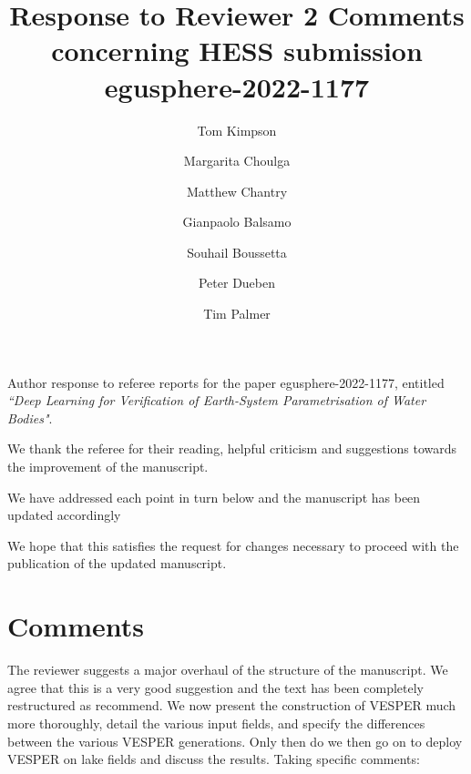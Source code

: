 \documentclass[10pt]{article}
\author{Tom Kimpson \\ 
	\and Margarita Choulga\\ 
 \and Matthew Chantry\\
\and Gianpaolo Balsamo\\  
 \and Souhail Boussetta\\
  \and Peter Dueben\\
   \and Tim Palmer\\
}
\title{\normalsize Response to Reviewer 2 Comments
  concerning HESS submission egusphere-2022-1177}
\begin{document}
	\maketitle
\noindent Author response to referee reports for the paper egusphere-2022-1177,
entitled \textit{``Deep Learning for Verification of Earth-System Parametrisation of Water Bodies"}. \newline 

\noindent We thank the referee for their reading, helpful criticism and suggestions towards the improvement of the manuscript. \newline 

\noindent We have addressed each point in turn below and the manuscript has been updated accordingly \newline 

\noindent  We hope that this satisfies the request for changes necessary to proceed with the publication of the updated manuscript. \newline 


\section*{Comments}
The reviewer suggests a major overhaul of the structure of the manuscript. We agree that this is a very good suggestion and the text has been completely restructured as recommend. We now present the construction of VESPER much more thoroughly, detail the various input fields, and specify the differences between the various VESPER generations.  Only then do we then go on to deploy VESPER on lake fields and discuss the results. Taking specific comments:
\end{document}
